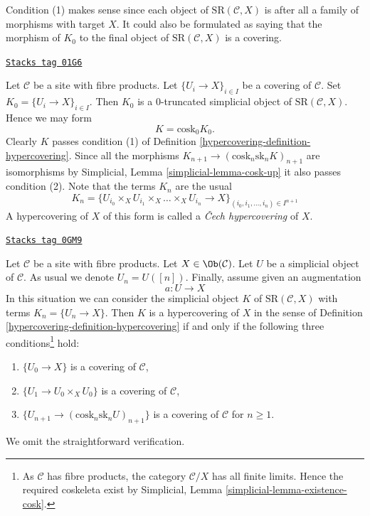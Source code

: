 Condition (1) makes sense since each object of
$\text{SR}(\mathcal{C}, X)$ is after all a family
of morphisms with target $X$. It could also be
formulated as saying that the morphism of $K_0$ to
the final object of $\text{SR}(\mathcal{C}, X)$
is a covering.

\begin{example}

\label{hypercovering-example-cech}
\href{https://stacks.math.columbia.edu/tag/01G6}{\texttt{Stacks tag 01G6}}

Let $\mathcal{C}$ be a site with fibre products.
Let $\{U_i \to X\}_{i \in I}$ be a covering of $\mathcal{C}$.
Set $K_0 = \{U_i \to X\}_{i \in I}$.
Then $K_0$ is a $0$-truncated simplicial object of
$\text{SR}(\mathcal{C}, X)$. Hence we may form
$$
K = \text{cosk}_0 K_0.
$$
Clearly $K$ passes condition (1) of Definition \ref{hypercovering-definition-hypercovering}.
Since all the morphisms $K_{n + 1} \to (\text{cosk}_n \text{sk}_n K)_{n + 1}$
are isomorphisms by
Simplicial, Lemma \ref{simplicial-lemma-cosk-up}
it also passes condition (2). Note that
the terms $K_n$ are the usual
$$
K_n = \{
U_{i_0} \times_X U_{i_1} \times_X \ldots \times_X U_{i_n} \to X
\}_{(i_0, i_1, \ldots, i_n) \in I^{n + 1}}
$$
A hypercovering of $X$ of this form is called a
{\it {\v C}ech hypercovering} of $X$.
\end{example}

\begin{example}

\label{hypercovering-example-hypercovering-in-C}
\href{https://stacks.math.columbia.edu/tag/0GM9}{\texttt{Stacks tag 0GM9}}

Let $\mathcal{C}$ be a site with fibre products. Let
$X \in \Ob(\mathcal{C})$. Let $U$ be a simplicial object of $\mathcal{C}$.
As usual we denote $U_n = U([n])$. Finally, assume given an augmentation
$$
a : U \to X
$$
In this situation we can consider the simplicial object $K$
of $\text{SR}(\mathcal{C}, X)$ with terms $K_n = \{U_n \to X\}$.
Then $K$ is a hypercovering of $X$ in the sense of
Definition \ref{hypercovering-definition-hypercovering}
if and only if the following three
conditions\footnote{As $\mathcal{C}$ has fibre products, the
category $\mathcal{C}/X$ has all finite limits.
Hence the required coskeleta exist by
Simplicial, Lemma \ref{simplicial-lemma-existence-cosk}.} hold:
\begin{enumerate}
\item $\{U_0 \to X\}$ is a covering of $\mathcal{C}$,
\item $\{U_1 \to U_0 \times_X U_0\}$ is a covering of $\mathcal{C}$,
\item $\{U_{n + 1} \to (\text{cosk}_n\text{sk}_n U)_{n + 1}\}$
is a covering of $\mathcal{C}$ for $n \geq 1$.
\end{enumerate}
We omit the straightforward verification.
\end{example}

